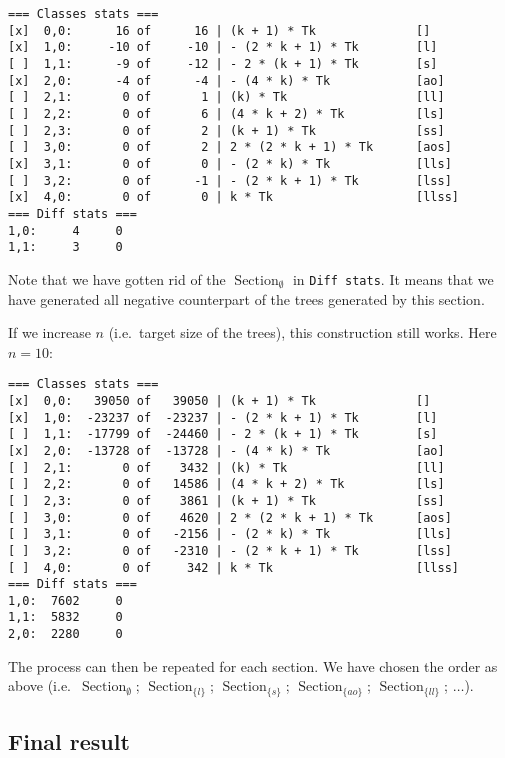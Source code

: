 \documentclass[final]{article}
\theoremstyle{definition}
\theoremstyle{definition}
\theoremstyle{remark}
\DeclareMathOperator{\tSection}{\text{Section}}
\begin{document}
\begin{lstlisting}
=== Classes stats ===
[x]  0,0:      16 of      16 | (k + 1) * Tk              []
[x]  1,0:     -10 of     -10 | - (2 * k + 1) * Tk        [l]
[ ]  1,1:      -9 of     -12 | - 2 * (k + 1) * Tk        [s]
[x]  2,0:      -4 of      -4 | - (4 * k) * Tk            [ao]
[ ]  2,1:       0 of       1 | (k) * Tk                  [ll]
[ ]  2,2:       0 of       6 | (4 * k + 2) * Tk          [ls]
[ ]  2,3:       0 of       2 | (k + 1) * Tk              [ss]
[ ]  3,0:       0 of       2 | 2 * (2 * k + 1) * Tk      [aos]
[x]  3,1:       0 of       0 | - (2 * k) * Tk            [lls]
[ ]  3,2:       0 of      -1 | - (2 * k + 1) * Tk        [lss]
[x]  4,0:       0 of       0 | k * Tk                    [llss]
=== Diff stats ===
1,0:     4     0
1,1:     3     0
\end{lstlisting}

Note that we have gotten rid of the \(\tSection_\emptyset\) in \verb|Diff stats|. It means that we have generated all negative counterpart of the trees generated by this section.

If we increase \(n\) (i.e.~target size of the trees), this construction still works. Here \(n = 10\):

\begin{lstlisting}
=== Classes stats ===
[x]  0,0:   39050 of   39050 | (k + 1) * Tk              []
[x]  1,0:  -23237 of  -23237 | - (2 * k + 1) * Tk        [l]
[ ]  1,1:  -17799 of  -24460 | - 2 * (k + 1) * Tk        [s]
[x]  2,0:  -13728 of  -13728 | - (4 * k) * Tk            [ao]
[ ]  2,1:       0 of    3432 | (k) * Tk                  [ll]
[ ]  2,2:       0 of   14586 | (4 * k + 2) * Tk          [ls]
[ ]  2,3:       0 of    3861 | (k + 1) * Tk              [ss]
[ ]  3,0:       0 of    4620 | 2 * (2 * k + 1) * Tk      [aos]
[ ]  3,1:       0 of   -2156 | - (2 * k) * Tk            [lls]
[ ]  3,2:       0 of   -2310 | - (2 * k + 1) * Tk        [lss]
[ ]  4,0:       0 of     342 | k * Tk                    [llss]
=== Diff stats ===
1,0:  7602     0
1,1:  5832     0
2,0:  2280     0
\end{lstlisting}

The process can then be repeated for each section. We have chosen the order as above (i.e.~\(\tSection_\emptyset\); \(\tSection_{\{l\}}\); \(\tSection_{\{s\}}\); \(\tSection_{\{ao\}}\); \(\tSection_{\{ll\}}\); \(\ldots\)).

\subsection{Final result}%
\label{sub:final_result}
\end{document}
